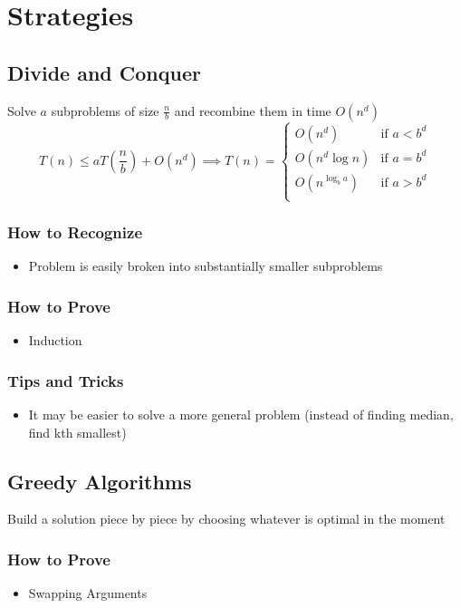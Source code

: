 \documentclass{article}
\begin{document}
\section*{Strategies}
\noindent\makebox[\linewidth]{\rule{\textwidth}{0.4pt}}
\subsection*{Divide and Conquer}
Solve $a$ subproblems of size $\frac{n}{b}$ and recombine them in time $O(n^d)$
\[
    T(n)\le aT\left(\frac{n}{b}\right)+O(n^d) \implies 
    T(n) = \begin{cases}
        O(n^d) & \text{if } a < b^d\\
        O(n^d\log n)& \text{if } a = b^d\\
        O(n^{\log_ba})& \text{if } a > b^d\\
    \end{cases}
\]
\subsubsection*{How to Recognize}
\begin{itemize}
    \item Problem is easily broken into substantially smaller subproblems 
\end{itemize}
\subsubsection*{How to Prove}
\begin{itemize}
    \item Induction
\end{itemize}
\subsubsection*{Tips and Tricks}
\begin{itemize}
    \item It may be easier to solve a more general problem (instead of finding median, find kth smallest)
\end{itemize}
\noindent\makebox[\linewidth]{\rule{\textwidth}{0.4pt}}
\subsection*{Greedy Algorithms}
Build a solution piece by piece by choosing whatever is optimal in the moment
\subsubsection*{How to Prove}
\begin{itemize}
    \item Swapping Arguments
\end{itemize}
\noindent\makebox[\linewidth]{\rule{\textwidth}{0.4pt}}
\end{document}
